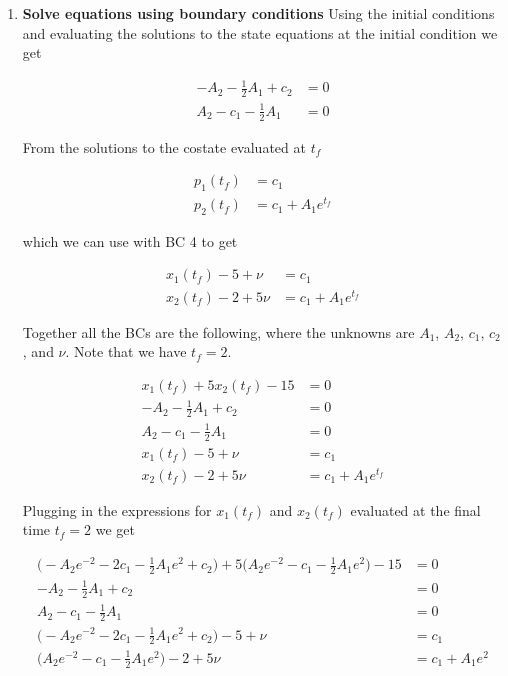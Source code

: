 \documentclass[11pt,letterpaper,onecolumn,notitlepage]{article}
\begin{document}
\begin{enumerate}
    \item{\textbf{Solve equations using boundary conditions}}
    Using the initial conditions and evaluating the solutions to the state equations at the initial condition we get

    \begin{align*}
      -A_{2}-\frac{1}{2}A_{1}+c_{2}&=0 \\
      A_{2}-c_{1}-\frac{1}{2}A_{1}&=0
    \end{align*}

    From the solutions to the costate evaluated at $t_{f}$

    \begin{align*}
      p_{1}(t_{f})&=c_{1} \\
      p_{2}(t_{f})&=c_{1}+A_{1}e^{t_{f}}
    \end{align*}

    which we can use with BC 4 to get

    \begin{align*}
      x_{1}(t_{f})-5+\nu&=c_{1} \\
      x_{2}(t_{f})-2+5\nu&=c_{1}+A_{1}e^{t_{f}}
    \end{align*}

    Together all the BCs are the following, where the unknowns are $A_{1}$, $A_{2}$, $c_{1}$, $c_{2}$, and $\nu$.
    Note that we have $t_{f}=2$.

    \begin{align*}
      x_{1}(t_{f})+5x_{2}(t_{f})-15&=0 \\
      -A_{2}-\frac{1}{2}A_{1}+c_{2}&=0 \\
      A_{2}-c_{1}-\frac{1}{2}A_{1}&=0 \\
      x_{1}(t_{f})-5+\nu&=c_{1} \\
      x_{2}(t_{f})-2+5\nu&=c_{1}+A_{1}e^{t_{f}}
    \end{align*}

    Plugging in the expressions for $x_{1}(t_{f})$ and $x_{2}(t_{f})$ evaluated at the final time $t_{f}=2$ we get

    \begin{align*}
      \bigr(-A_{2}e^{-2}-2c_{1}-\frac{1}{2}A_{1}e^{2}+c_{2}\bigr)+5\bigr(A_{2}e^{-2}-c_{1}-\frac{1}{2}A_{1}e^{2}\bigr)-15&=0 \\
      -A_{2}-\frac{1}{2}A_{1}+c_{2}&=0 \\
      A_{2}-c_{1}-\frac{1}{2}A_{1}&=0 \\
      \bigr(-A_{2}e^{-2}-2c_{1}-\frac{1}{2}A_{1}e^{2}+c_{2}\bigr)-5+\nu&=c_{1} \\
      \bigr(A_{2}e^{-2}-c_{1}-\frac{1}{2}A_{1}e^{2}\bigr)-2+5\nu&=c_{1}+A_{1}e^{2} \\
    \end{align*}


\end{enumerate}
\end{document}
